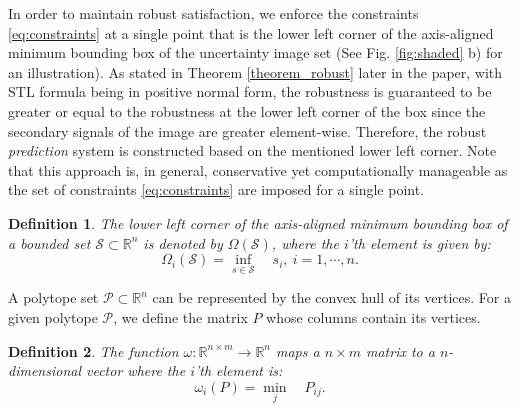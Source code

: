 \documentclass[letterpaper, 10 pt, conference]{ieeeconf}
\newtheorem{define}{Definition}
\begin{document}
In order to maintain robust satisfaction, we enforce the constraints \eqref{eq:constraints} at a single point that is the lower left corner of the axis-aligned minimum bounding box of the uncertainty image set (See Fig. \ref{fig:shaded} b) for an illustration).
As stated in Theorem \ref{theorem_robust} later in the paper, with STL formula being in positive normal form, the robustness is guaranteed to be greater or equal to the robustness at the lower left corner of the box since the secondary signals of the image are greater element-wise. Therefore, the robust \emph{prediction} system is constructed based on the mentioned lower left corner. Note that this approach is, in general, conservative yet computationally manageable as the set of constraints \eqref{eq:constraints} are imposed for a single point.









\begin{define}
The lower left corner of the axis-aligned minimum bounding box of a bounded set $\mathcal{S} \subset \mathbb{R}^n$ is denoted by $\Omega(\mathcal{S})$, where the $i$'th element is given by:
\begin{equation}
\Omega_i(\mathcal{S})=\underset{s \in \mathcal{S} }\inf \quad s_i, ~i=1,\cdots,n.
\end{equation}
\end{define}

A polytope set $\mathcal{P} \subset \mathbb{R}^n$ can be represented by the convex hull of its vertices. For a given polytope $\mathcal{P}$, we define the matrix $P$ whose columns contain its vertices. 
\begin{define}
The function $ \omega: \mathbb{R}^{n\times m} \rightarrow  \mathbb{R}^n$ maps a $n\times m$ matrix to a $n$-dimensional vector where the $i$'th element is:
\begin{equation}
\omega_i(P)=\underset{j} \min \quad P_{ij}.
\end{equation}
 \end{define}
 
\end{document}
